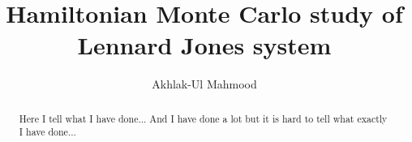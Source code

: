 \documentclass[aps,prl,preprint]{revtex4-1}
\begin{document}
\title{Hamiltonian Monte Carlo study of Lennard Jones system}
\author{Akhlak-Ul Mahmood}

\begin{abstract}
Here I tell what I have done... And I have done a lot but it is hard to tell what exactly I have done...
\end{abstract}

\maketitle

\blindtext \cite{article-minimal}




\end{document}

